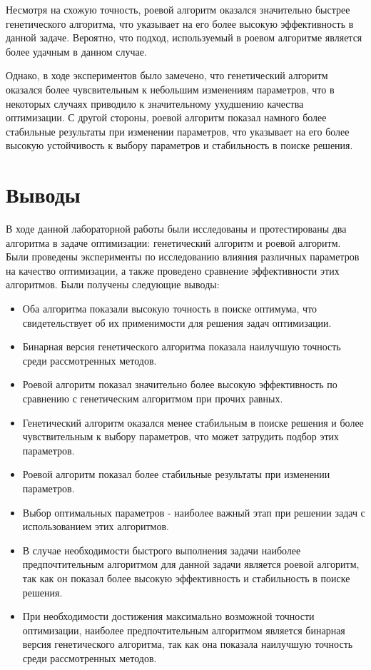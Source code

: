 \documentclass[12pt,a4paper]{article}
\begin{document}
Несмотря на схожую точность, роевой алгоритм оказался значительно быстрее генетического алгоритма, что указывает
на его более высокую эффективность в данной задаче. Вероятно, что подход, используемый в роевом алгоритме является
более удачным в данном случае.

Однако, в ходе экспериментов было замечено, что генетический алгоритм оказался более чувсвительным к небольшим
изменениям параметров, что в некоторых случаях приводило к значительному ухудшению качества оптимизации.
С другой стороны, роевой алгоритм показал намного более стабильные результаты  при изменении параметров, что
указывает на его более высокую устойчивость к выбору параметров и стабильность в поиске решения.

\section{Выводы}
В ходе данной лабораторной работы были исследованы и протестированы два алгоритма в задаче оптимизации:
генетический алгоритм и роевой алгоритм. Были проведены эксперименты по исследованию влияния
различных параметров на качество оптимизации, а также проведено сравнение эффективности этих алгоритмов.
Были получены следующие выводы:
\begin{itemize}
    \item Оба алгоритма показали высокую точность в поиске оптимума, что свидетельствует об их применимости для решения задач оптимизации.
    \item Бинарная версия генетического алгоритма показала наилучшую точность среди рассмотренных методов.
    \item Роевой алгоритм показал значительно более высокую эффективность по сравнению с генетическим алгоритмом при прочих равных.
    \item Генетический алгоритм оказался менее стабильным в поиске решения и более чувствительным к выбору параметров, что может затрудить подбор этих параметров.
    \item Роевой алгоритм показал более стабильные результаты при изменении параметров.
    \item Выбор оптимальных параметров - наиболее важный этап при решении задач с использованием этих алгоритмов.
    \item В случае необходимости быстрого выполнения задачи наиболее предпочтительным алгоритмом для данной задачи является роевой алгоритм, так как он показал более высокую эффективность и стабильность в поиске решения.
    \item При необходимости достижения максимально возможной точности оптимизации, наиболее предпочтительным алгоритмом является бинарная версия генетического алгоритма, так как она показала наилучшую точность среди рассмотренных методов.
\end{itemize}
\end{document}
